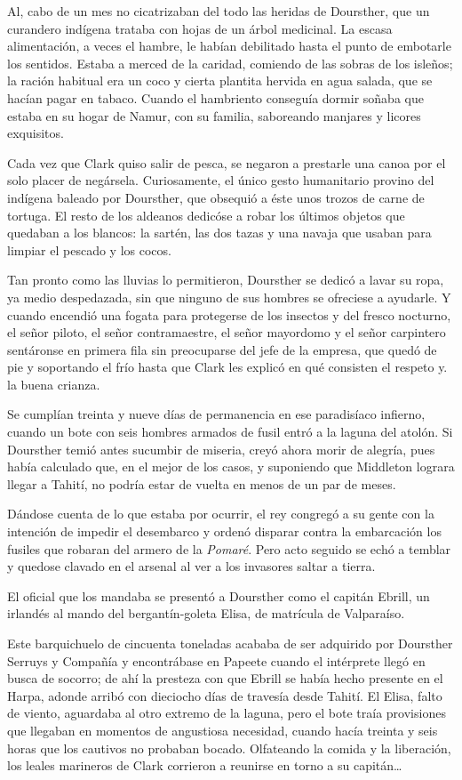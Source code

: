 \documentclass[10pt,twoside,openright]{memoir}
\begin{document}
Al, cabo de un mes no cicatrizaban del todo las heridas de Doursther,
que un curandero indígena trataba con hojas de un árbol medicinal. La
escasa alimentación, a veces el hambre, le habían debilitado hasta el
punto de embotarle los sentidos. Estaba a merced de la caridad, comiendo
de las sobras de los isleños; la ración habitual era un coco y cierta
plantita hervida en agua salada, que se hacían pagar en tabaco. Cuando
el hambriento conseguía dormir soñaba que estaba en su hogar de Namur,
con su familia, saboreando manjares y licores exquisitos.

Cada vez que Clark quiso salir de pesca, se negaron a prestarle una
canoa por el solo placer de negársela. Curiosamente, el único gesto
humanitario provino del indígena baleado por Doursther, que obsequió a
éste unos trozos de carne de tortuga. El resto de los aldeanos dedicóse
a robar los últimos objetos que quedaban a los blancos: la sartén, las
dos tazas y una navaja que usaban para limpiar el pescado y los cocos.

Tan pronto como las lluvias lo permitieron, Doursther se dedicó a lavar
su ropa, ya medio despedazada, sin que ninguno de sus hombres se
ofreciese a ayudarle. Y cuando encendió una fogata para protegerse de
los insectos y del fresco nocturno, el señor piloto, el señor
contramaestre, el señor mayordomo y el señor carpintero sentáronse en
primera fila sin preocuparse del jefe de la empresa, que quedó de pie y
soportando el frío hasta que Clark les explicó en qué consisten el
respeto y. la buena crianza.

Se cumplían treinta y nueve días de permanencia en ese paradisíaco
infierno, cuando un bote con seis hombres armados de fusil entró a la
laguna del atolón. Si Doursther temió antes sucumbir de miseria, creyó
ahora morir de alegría, pues había calculado que, en el mejor de los
casos, y suponiendo que Middleton lograra llegar a Tahití, no podría
estar de vuelta en menos de un par de meses.

Dándose cuenta de lo que estaba por ocurrir, el
rey congregó a su gente con la
intención de impedir el desembarco y ordenó disparar contra la
embarcación los fusiles que robaran del armero de la \emph{Pomaré}. Pero acto
seguido se echó a temblar y quedose clavado en el arsenal al ver a los
invasores saltar a tierra.

El oficial que los mandaba se presentó a Doursther como el capitán
Ebrill, un irlandés al mando del bergantín-goleta Elisa, de matrícula de
Valparaíso.

Este barquichuelo de cincuenta
toneladas acababa de ser adquirido por Doursther Serruys y Compañía y
encontrábase en Papeete cuando el intérprete llegó en busca de socorro;
de ahí la presteza con que Ebrill se había hecho presente en el Harpa,
adonde arribó con dieciocho días de travesía desde Tahití. El Elisa,
falto de viento, aguardaba al otro extremo de la laguna, pero el bote
traía provisiones que llegaban en momentos de angustiosa necesidad,
cuando hacía treinta y seis horas que los cautivos no probaban bocado.
Olfateando la comida y la liberación, los leales marineros de Clark
corrieron a reunirse en torno a su capitán\ldots
\end{document}
